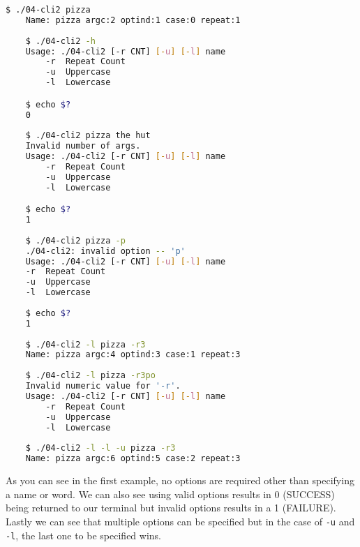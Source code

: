 \documentclass[../main.tex]{subfiles}
\begin{document}
	
	\begin{lstlisting}[language=bash, numbers=none]
	$ ./04-cli2 pizza
	Name: pizza argc:2 optind:1 case:0 repeat:1
	
	$ ./04-cli2 -h
	Usage: ./04-cli2 [-r CNT] [-u] [-l] name
		-r	Repeat Count
		-u	Uppercase
		-l	Lowercase

	$ echo $?
	0
	
	$ ./04-cli2 pizza the hut
	Invalid number of args.
	Usage: ./04-cli2 [-r CNT] [-u] [-l] name
		-r	Repeat Count
		-u	Uppercase
		-l	Lowercase

	$ echo $?
	1
	
	$ ./04-cli2 pizza -p
	./04-cli2: invalid option -- 'p'
	Usage: ./04-cli2 [-r CNT] [-u] [-l] name
	-r	Repeat Count
	-u	Uppercase
	-l	Lowercase
	
	$ echo $?
	1
	
	$ ./04-cli2 -l pizza -r3
	Name: pizza argc:4 optind:3 case:1 repeat:3
	 
	$ ./04-cli2 -l pizza -r3po
	Invalid numeric value for '-r'.
	Usage: ./04-cli2 [-r CNT] [-u] [-l] name
		-r	Repeat Count
		-u	Uppercase
		-l	Lowercase
	
	$ ./04-cli2 -l -l -u pizza -r3
	Name: pizza argc:6 optind:5 case:2 repeat:3
	\end{lstlisting}
	
	As you can see in the first example, no options are required other than specifying a name or word.  We can also see using valid options results in 0 (SUCCESS) being returned to our terminal but invalid options results in a 1 (FAILURE).  Lastly we can see that multiple options can be specified but in the case of \texttt{-u} and \texttt{-l}, the last one to be specified wins.
	
\end{document}
